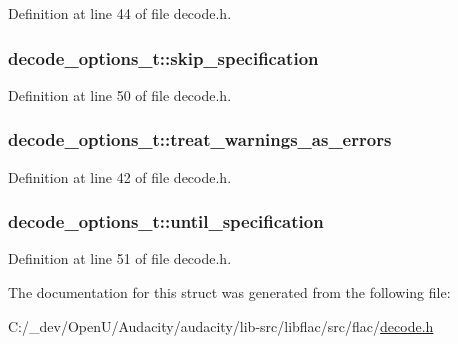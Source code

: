 Definition at line 44 of file decode.\+h.

\subsubsection[{\texorpdfstring{skip\+\_\+specification}{skip_specification}}]{ decode\+\_\+options\+\_\+t\+::skip\+\_\+specification}\hypertarget{structdecode__options__t_ae0c5755b752eadb15f59d3ef9b6bb0f2}{}\label{structdecode__options__t_ae0c5755b752eadb15f59d3ef9b6bb0f2}


Definition at line 50 of file decode.\+h.

\subsubsection[{\texorpdfstring{treat\+\_\+warnings\+\_\+as\+\_\+errors}{treat_warnings_as_errors}}]{ decode\+\_\+options\+\_\+t\+::treat\+\_\+warnings\+\_\+as\+\_\+errors}\hypertarget{structdecode__options__t_abae2f012f8191971a2f21f1a4bd44422}{}\label{structdecode__options__t_abae2f012f8191971a2f21f1a4bd44422}


Definition at line 42 of file decode.\+h.

\subsubsection[{\texorpdfstring{until\+\_\+specification}{until_specification}}]{ decode\+\_\+options\+\_\+t\+::until\+\_\+specification}\hypertarget{structdecode__options__t_adf0451f0eb4d260bd5e03948900626fa}{}\label{structdecode__options__t_adf0451f0eb4d260bd5e03948900626fa}


Definition at line 51 of file decode.\+h.



The documentation for this struct was generated from the following file\+:\begin{DoxyCompactItemize}
\item 
C\+:/\+\_\+dev/\+Open\+U/\+Audacity/audacity/lib-\/src/libflac/src/flac/\hyperlink{decode_8h}{decode.\+h}\end{DoxyCompactItemize}
